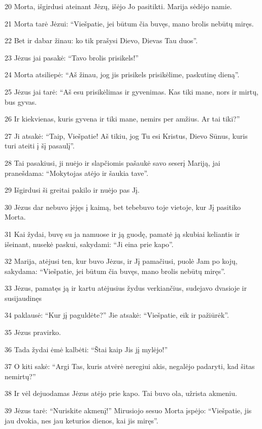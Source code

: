 \par 20 Morta, išgirdusi ateinant Jėzų, išėjo Jo pasitikti. Marija sėdėjo namie. 
\par 21 Morta tarė Jėzui: “Viešpatie, jei būtum čia buvęs, mano brolis nebūtų miręs. 
\par 22 Bet ir dabar žinau: ko tik prašysi Dievo, Dievas Tau duos”. 
\par 23 Jėzus jai pasakė: “Tavo brolis prisikels!” 
\par 24 Morta atsiliepė: “Aš žinau, jog jis prisikels prisikėlime, paskutinę dieną”. 
\par 25 Jėzus jai tarė: “Aš esu prisikėlimas ir gyvenimas. Kas tiki mane, nors ir mirtų, bus gyvas. 
\par 26 Ir kiekvienas, kuris gyvena ir tiki mane, nemirs per amžius. Ar tai tiki?” 
\par 27 Ji atsakė: “Taip, Viešpatie! Aš tikiu, jog Tu esi Kristus, Dievo Sūnus, kuris turi ateiti į šį pasaulį”. 
\par 28 Tai pasakiusi, ji nuėjo ir slapčiomis pašaukė savo seserį Mariją, jai pranešdama: “Mokytojas atėjo ir šaukia tave”. 
\par 29 Išgirdusi ši greitai pakilo ir nuėjo pas Jį. 
\par 30 Jėzus dar nebuvo įėjęs į kaimą, bet tebebuvo toje vietoje, kur Jį pasitiko Morta. 
\par 31 Kai žydai, buvę su ja namuose ir ją guodę, pamatė ją skubiai keliantis ir išeinant, nusekė paskui, sakydami: “Ji eina prie kapo”. 
\par 32 Marija, atėjusi ten, kur buvo Jėzus, ir Jį pamačiusi, puolė Jam po kojų, sakydama: “Viešpatie, jei būtum čia buvęs, mano brolis nebūtų miręs”. 
\par 33 Jėzus, pamatęs ją ir kartu atėjusius žydus verkiančius, sudejavo dvasioje ir susijaudinęs 
\par 34 paklausė: “Kur jį paguldėte?” Jie atsakė: “Viešpatie, eik ir pažiūrėk”. 
\par 35 Jėzus pravirko. 
\par 36 Tada žydai ėmė kalbėti: “Štai kaip Jis jį mylėjo!” 
\par 37 O kiti sakė: “Argi Tas, kuris atvėrė neregiui akis, negalėjo padaryti, kad šitas nemirtų?” 
\par 38 Ir vėl dejuodamas Jėzus atėjo prie kapo. Tai buvo ola, užrista akmeniu. 
\par 39 Jėzus tarė: “Nuriskite akmenį!” Mirusiojo sesuo Morta įspėjo: “Viešpatie, jis jau dvokia, nes jau keturios dienos, kai jis miręs”. 
